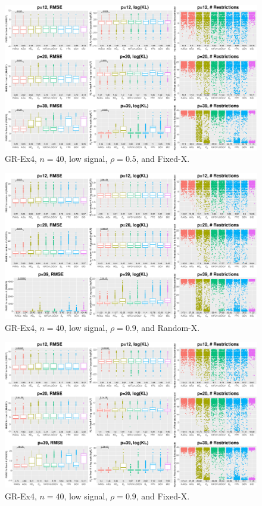 \begin{figure}[!ht]
\centering
\includegraphics[width=\textwidth]{figures/supplement/fixedx_GR-Ex4_n40_lsnr_rho05.eps}
\caption{GR-Ex4, $n=40$, low signal, $\rho=0.5$, and Fixed-X.}
\end{figure}
\clearpage
\begin{figure}[!ht]
\centering
\includegraphics[width=\textwidth]{figures/supplement/randomx_GR-Ex4_n40_lsnr_rho09.eps}
\caption{GR-Ex4, $n=40$, low signal, $\rho=0.9$, and Random-X.}
\end{figure}
\begin{figure}[!ht]
\centering
\includegraphics[width=\textwidth]{figures/supplement/fixedx_GR-Ex4_n40_lsnr_rho09.eps}
\caption{GR-Ex4, $n=40$, low signal, $\rho=0.9$, and Fixed-X.}
\end{figure}
